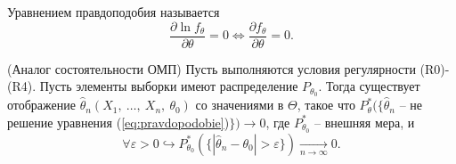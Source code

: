 \begin{definition}
    Уравнением правдоподобия называется
    \begin{equation}\label{eq:pravdopodobie}
        \dfrac{\partial \ln f_{\theta }}{\partial \theta } =0\Leftrightarrow \dfrac{\partial f_{\theta }}{\partial \theta } =0.
    \end{equation}
\end{definition}
\begin{theorem}
    (Аналог состоятельности ОМП) Пусть выполняются условия регулярности (R0)-(R4). Пусть элементы выборки имеют распределение $\displaystyle P_{\theta _{0}}$. Тогда существует отображение \newline $\displaystyle \hat{\theta }_{n}( X_{1} ,\ \dotsc ,\ X_{n} ,\ \theta _{0})$ со значениями в $\displaystyle \Theta $, такое что $\displaystyle P_{\theta }^{*}(\{\hat{\theta }_{n}$ -- не решение уравнения (\ref{eq:pravdopodobie})$\displaystyle \})\rightarrow 0$, где $\displaystyle P_{\theta_0 }^{*}$ -- внешняя мера, и
    \begin{equation*}
        \forall \varepsilon  >0\hookrightarrow P_{\theta_0 }^{*}(\{| \hat{\theta }_{n} -\theta _{0}|  >\varepsilon \})\xrightarrow[n\rightarrow \infty ]{} 0.
    \end{equation*}
\end{theorem}
